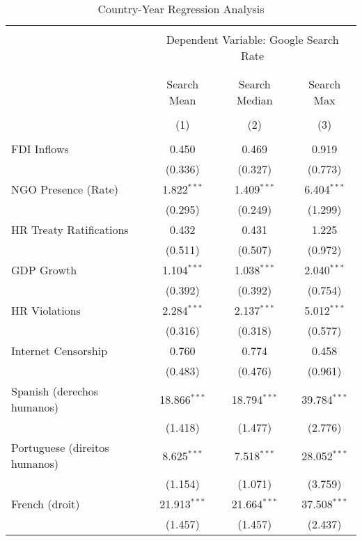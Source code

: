 
\begin{table}[!htbp] \centering 
  \caption{Country-Year Regression Analysis} 
  \label{} 
\begin{tabular}{@{\extracolsep{5pt}}lccc} 
\\[-1.8ex]\hline 
\hline \\[-1.8ex] 
 & \multicolumn{3}{c}{Dependent Variable: Google Search Rate} \\ 
\cline{2-4} 
\\[-1.8ex] & \multicolumn{3}{c}{ } \\ 
 & Search Mean & Search Median & Search Max \\ 
\\[-1.8ex] & (1) & (2) & (3)\\ 
\hline \\[-1.8ex] 
 FDI Inflows & 0.450 & 0.469 & 0.919 \\ 
  & (0.336) & (0.327) & (0.773) \\ 
  NGO Presence (Rate) & 1.822$^{***}$ & 1.409$^{***}$ & 6.404$^{***}$ \\ 
  & (0.295) & (0.249) & (1.299) \\ 
  HR Treaty Ratifications & 0.432 & 0.431 & 1.225 \\ 
  & (0.511) & (0.507) & (0.972) \\ 
  GDP Growth & 1.104$^{***}$ & 1.038$^{***}$ & 2.040$^{***}$ \\ 
  & (0.392) & (0.392) & (0.754) \\ 
  HR Violations & 2.284$^{***}$ & 2.137$^{***}$ & 5.012$^{***}$ \\ 
  & (0.316) & (0.318) & (0.577) \\ 
  Internet Censorship & 0.760 & 0.774 & 0.458 \\ 
  & (0.483) & (0.476) & (0.961) \\ 
  Spanish (derechos humanos) & 18.866$^{***}$ & 18.794$^{***}$ & 39.784$^{***}$ \\ 
  & (1.418) & (1.477) & (2.776) \\ 
  Portuguese (direitos humanos) & 8.625$^{***}$ & 7.518$^{***}$ & 28.052$^{***}$ \\ 
  & (1.154) & (1.071) & (3.759) \\ 
  French (droit) & 21.913$^{***}$ & 21.664$^{***}$ & 37.508$^{***}$ \\ 
  & (1.457) & (1.457) & (2.437) \\ 

\end{tabular}
\end{table}
